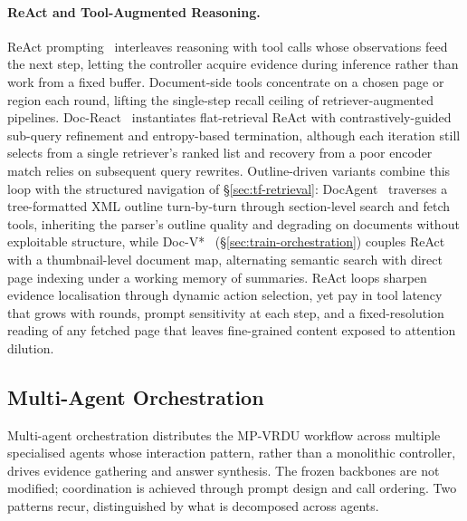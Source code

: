 \documentclass[11pt]{article}
\begin{document}
\paragraph{ReAct and Tool-Augmented Reasoning.}
ReAct prompting~\cite{yao2022react} interleaves reasoning with tool calls whose observations feed the next step, letting the controller acquire evidence during inference rather than work from a fixed buffer. Document-side tools concentrate on a chosen page or region each round, lifting the single-step recall ceiling of retriever-augmented pipelines. Doc-React~\cite{wu2025docreact} instantiates flat-retrieval ReAct with contrastively-guided sub-query refinement and entropy-based termination, although each iteration still selects from a single retriever's ranked list and recovery from a poor encoder match relies on subsequent query rewrites. Outline-driven variants combine this loop with the structured navigation of \S\ref{sec:tf-retrieval}: DocAgent~\cite{sun2025docagent} traverses a tree-formatted XML outline turn-by-turn through section-level search and fetch tools, inheriting the parser's outline quality and degrading on documents without exploitable structure, while Doc-V*~\cite{zheng2026docv} (\S\ref{sec:train-orchestration}) couples ReAct with a thumbnail-level document map, alternating semantic search with direct page indexing under a working memory of summaries. ReAct loops sharpen evidence localisation through dynamic action selection, yet pay in tool latency that grows with rounds, prompt sensitivity at each step, and a fixed-resolution reading of any fetched page that leaves fine-grained content exposed to attention dilution.

\subsection{Multi-Agent Orchestration}
\label{sec:agent-orchestration}

Multi-agent orchestration distributes the MP-VRDU workflow across multiple specialised agents whose interaction pattern, rather than a monolithic controller, drives evidence gathering and answer synthesis. The frozen backbones are not modified; coordination is achieved through prompt design and call ordering. Two patterns recur, distinguished by what is decomposed across agents.
\end{document}
